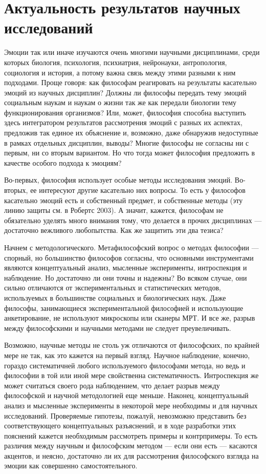 \documentclass[11pt]{book}
\begin{document}
\section{Актуальность результатов научных исследований}

Эмоции так или иначе изучаются очень многими научными дисциплинами, среди которых биология, психология, психиатрия, нейронауки, антропология, социология и история, а потому важна связь между этими разными к ним подходами. Проще говоря: как философам реагировать на результаты касательно эмоций из научных дисциплин? Должны ли философы передать тему эмоций социальным наукам и наукам о жизни так же как передали биологии тему функционирования организмов? Или, может, философия способна выступить здесь интегратором результатов рассмотрения эмоций с разных их аспектах, предложив так единое их объяснение и, возможно, даже обнаружив недоступные в рамках отдельных дисциплин, выводы? Многие философы не согласны ни с первым, ни со вторым вариантом. Но что тогда может философия предложить в качестве особого подхода к эмоциям?

Во-первых, философия использует особые методы исследования эмоций. Во-вторых, ее интересуют другие касательно них вопросы. То есть у философов касательно эмоций есть и собственный предмет, и собственные методы (эту линию защиты см. в Робертс 2003). А значит, кажется, философам не обязательно уделять много внимания тому, что делается в прочих дисциплинах --- достаточно вежливого любопытства. Как же защитить эти два тезиса?

Начнем с методологического. Метафилософский вопрос о методах философии --- спорный, но большинство философов согласны, что основными инструментами являются концептуальный анализ, мысленные эксперименты, интроспекция и наблюдение. Но достаточно ли они точны и надежны? Во всяком случае, они сильно отличаются от экспериментальных и статистических методов, используемых в большинстве социальных и биологических наук. Даже философы, занимающиеся экспериментальной философией и использующие анкетирование, не используют микроскопы или сканеры МРТ. И все же, разрыв между философскими и научными методами не следует преувеличивать.

Возможно, научные методы не столь уж отличаются от философских, по крайней мере не так, как это кажется на первый взгляд. Научное наблюдение, конечно, гораздо систематичней любого используемого философами метода, но ведь и философии в той или иной мере свойственна систематичность. Интроспекция же может считаться своего рода наблюдением, что делает разрыв между философской и научной методологией еще меньше. Наконец, концептуальный анализ и мысленные эксперименты в некоторой мере необходимы и для научных исследований. Проверяемые гипотезы, пожалуй, невозможно представить без соответствующего концептуальных разъяснений, и в ходе разработки этих пояснений кажется необходимым рассмотреть примеры и контрпримеры. То есть различия между научным и философским методом --- если они есть --- касаются акцентов, и неясно, достаточно ли их для рассмотрения философского взгляда на эмоции как совершенно самостоятельного.
\end{document}
